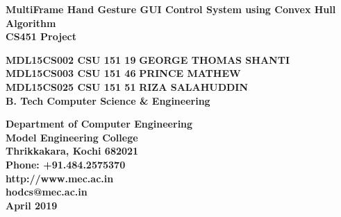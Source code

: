 \documentclass[11pt]{report}
\begin{document}
\renewcommand\bibname{References}
\pagestyle{fancy}
\fancyhead{}
\fancyfoot{}
\fancyfoot[c]{\thepage}
\renewcommand{\chaptermark}[1]{
\markboth{\thechapter.\ #1}{}} 
\renewcommand{\headrulewidth}{0.1pt}
\fancyhead[r]{\slshape \leftmark}
\addtolength{\headheight}{\baselineskip}
\addtolength{\headsep}{.1in}
\lhead{\nouppercase{\rightmark}}
\rhead{\nouppercase{\leftmark}}

\begin{titlepage}
\begin{center}

\Huge{\textbf{MultiFrame Hand Gesture GUI Control System using Convex Hull Algorithm}}\\
\vspace{0.05in}
\large{\textbf{CS451 Project\\}}
\vspace{1.2in}

\Large{\textbf{MDL15CS002 CSU 151 19}}	\hspace{.1in}	\Large{\textbf{GEORGE THOMAS SHANTI}}\\ 
\Large{\textbf{MDL15CS003 CSU 151 46}}	\hspace{.1in}	\Large{\textbf{PRINCE MATHEW}}\\ 
\Large{\textbf{MDL15CS025 CSU 151 51}}	\hspace{.1in}	\Large{\textbf{RIZA SALAHUDDIN}}\\ 
\Large{\textbf{B. Tech Computer Science \& Engineering}}


\vspace{1in}
\begin{figure}[h]
\begin{center}
\end{center}
\end{figure}
\textbf{
Department of Computer Engineering\\
Model Engineering College\\
Thrikkakara, Kochi 682021\\
Phone: +91.484.2575370\\
http://www.mec.ac.in \\
hodcs@mec.ac.in\\
\vspace{0.2in}
{\upshape April 2019}
}
\end{center}
\end{titlepage}
\end{document}
